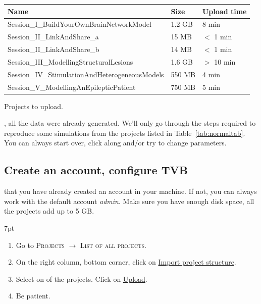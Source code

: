 \documentclass{tufte-handout}
\newenvironment{formal}{%
  \def\FrameCommand{%
    \hspace{1pt}%
    {\color{DarkBlue}\vrule width 2pt}%
    {\color{formalshade}\vrule width 4pt}%
    \colorbox{formalshade}%
  }%
  \MakeFramed{\advance\hsize-\width\FrameRestore}%
  \noindent\hspace{-4.55pt}%
  \begin{adjustwidth}{}{7pt}%
  \vspace{2pt}\vspace{2pt}%
}
{%
  \vspace{2pt}\end{adjustwidth}\endMakeFramed%
}
\begin{document}
\begin{margintable}
  \centering
  \selectfont
  \begin{tabular}{lll}
    \toprule
    Name & Size & Upload time\\
    \midrule
    Session\_I\_BuildYourOwnBrainNetworkModel  & 1.2 GB & 8 min \\
    Session\_II\_LinkAndShare\_a & 15 MB &  $<$ 1 min \\
    Session\_II\_LinkAndShare\_b & 14 MB &  $<$ 1 min \\
    Session\_III\_ModellingStructuralLesions & 1.6 GB &  $>$ 10 min \\
    Session\_IV\_StimulationAndHeterogeneousModels & 550 MB &  4 min \\
    Session\_V\_ModellingAnEpilepticPatient & 750 MB & 5 min \\ 
    \bottomrule
  \end{tabular}
  \caption{Projects to upload.}
  \label{tab:normaltab}
\end{margintable}

, all the data were already generated. We'll only go through the steps required 
to reproduce some simulations from the projects listed in Table~\ref{tab:normaltab}. You can always start over, click along and/or try to change parameters.


\subsection{Create an account, configure TVB}

 that you have already created an account in your machine. 
If not, you can always work with the default account \textit{admin}. 
Make sure you have enough disk space, all the projects add up to 5 GB. 


\begin{formal}
\begin{enumerate}
\item Go to \textsc{Projects} $\rightarrow$ \textsc{List of all projects}.
\item On the right column, bottom corner, click on \underline{Import project structure}.
\item Select on of the projects. Click on \underline{Upload}.
\item Be patient.
\end{enumerate}
\end{formal}
\end{document}
